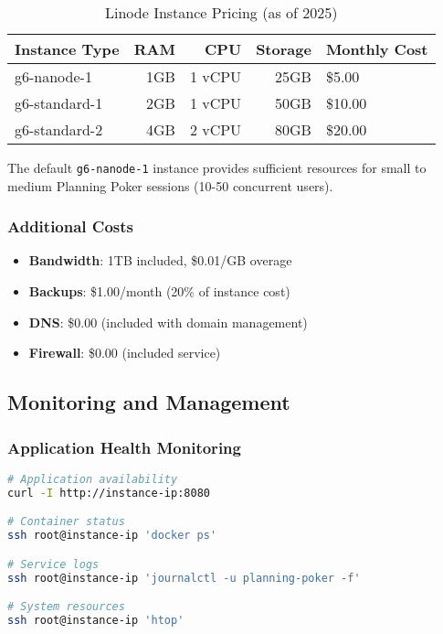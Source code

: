 \documentclass[11pt,a4paper]{article}
\begin{document}
\begin{table}[H]
\centering
\begin{tabular}{@{}lrrrl@{}}
\toprule
\textbf{Instance Type} & \textbf{RAM} & \textbf{CPU} & \textbf{Storage} & \textbf{Monthly Cost} \\
\midrule
g6-nanode-1 & 1GB & 1 vCPU & 25GB & \$5.00 \\
g6-standard-1 & 2GB & 1 vCPU & 50GB & \$10.00 \\
g6-standard-2 & 4GB & 2 vCPU & 80GB & \$20.00 \\
\bottomrule
\end{tabular}
\caption{Linode Instance Pricing (as of 2025)}
\label{tab:linode-pricing}
\end{table}

The default \texttt{g6-nanode-1} instance provides sufficient resources for small to medium Planning Poker sessions (10-50 concurrent users).

\subsubsection{Additional Costs}

\begin{itemize}
    \item \textbf{Bandwidth}: 1TB included, \$0.01/GB overage
    \item \textbf{Backups}: \$1.00/month (20\% of instance cost)
    \item \textbf{DNS}: \$0.00 (included with domain management)
    \item \textbf{Firewall}: \$0.00 (included service)
\end{itemize}

\subsection{Monitoring and Management}

\subsubsection{Application Health Monitoring}

\begin{lstlisting}[language=bash, caption=Health Check Commands]
# Application availability
curl -I http://instance-ip:8080

# Container status
ssh root@instance-ip 'docker ps'

# Service logs
ssh root@instance-ip 'journalctl -u planning-poker -f'

# System resources
ssh root@instance-ip 'htop'
\end{lstlisting}
\end{document}
